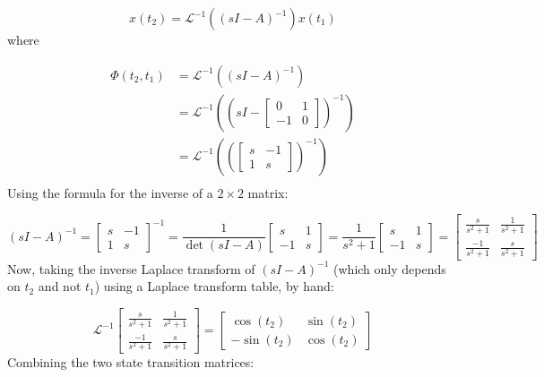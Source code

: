 \begin{example}
  \begin{equation*}
    x(t_{2})=\mathscr{L}^{-1}((sI-A)^{-1})x(t_{1})
  \end{equation*}
  where

  \begin{equation*}
    \begin{split}
      \Phi(t_{2},t_{1})&=\mathscr{L}^{-1}((sI-A)^{-1}) \\
      &=\mathscr{L}^{-1}
      \left(
        \left(sI-
          \begin{bmatrix}
            0 & 1 \\ -1 & 0
          \end{bmatrix}
        \right)^{-1}
      \right) \\
      &=\mathscr{L}^{-1}
      \left(
        \left(
          \begin{bmatrix}
          s & -1 \\ 1 & s
          \end{bmatrix}
        \right)^{-1}
      \right) \\
    \end{split}
  \end{equation*}
  Using the formula for the inverse of a $2\times2$ matrix:

  \begin{equation*}
    (sI-A)^{-1}=
    \begin{bmatrix}
      s & -1 \\ 1 & s
    \end{bmatrix}^{-1}=\frac{1}{\det(sI-A)}
    \begin{bmatrix}
      s & 1 \\ -1 & s
    \end{bmatrix}=\frac{1}{s^2+1}
    \begin{bmatrix}
      s & 1 \\ -1 & s
    \end{bmatrix}=
    \begin{bmatrix}
      \frac{s}{s^2+1} & \frac{1}{s^2+1} \\ \frac{-1}{s^2+1} & \frac{s}{s^2+1}
    \end{bmatrix}
  \end{equation*}
  Now, taking the inverse Laplace transform of $(sI-A)^{-1}$ (which only depends on $t_{2}$ and not $t_{1}$) using a Laplace transform table, by hand:

  \begin{equation*}
    \mathscr{L}^{-1}
    \begin{bmatrix}
      \frac{s}{s^2+1} & \frac{1}{s^2+1} \\ \frac{-1}{s^2+1} & \frac{s}{s^2+1}
    \end{bmatrix}=
    \begin{bmatrix}
      \cos(t_{2}) & \sin(t_{2}) \\ -\sin(t_{2}) & \cos(t_{2})
    \end{bmatrix}
  \end{equation*}
  Combining the two state transition matrices:


\end{example}

